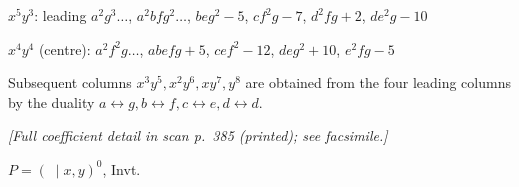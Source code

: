 \documentclass[11pt]{article}
\begin{document}
\noindent
$x^{5}y^{3}$: leading $a^{2}g^{3}\ldots$, $a^{2}bfg^{2}\ldots$, $beg^{2}-5$, $cf^{2}g-7$, $d^{2}fg+2$, $de^{2}g-10$
\smallskip

\noindent
$x^{4}y^{4}$ (centre): $a^{2}f^{2}g\ldots$, $abefg+5$, $cef^{2}-12$, $deg^{2}+10$, $e^{2}fg-5$
\smallskip

\noindent
Subsequent columns $x^{3}y^{5},x^{2}y^{6},xy^{7},y^{8}$ are obtained
from the four leading columns by the duality
$a\leftrightarrow g,b\leftrightarrow f,c\leftrightarrow
e,d\leftrightarrow d$.

\medskip
\noindent
\textit{[Full coefficient detail in scan p.~385 (printed); see
facsimile.]}

\newpage

\begin{center}
$P=(\;\mid x,y)^{0}$, Invt.


\end{center}
\end{document}
